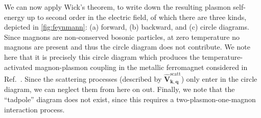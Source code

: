 \documentclass[aps,prb,reprint,twocolumns,superscriptaddress,nofootinbib]{revtex4-2}
\begin{document}
	We can now apply Wick's theorem, to write down the resulting plasmon self-energy \cite{stoofUltracoldQuantumFields2009} up to second order in the electric field, of which there are three kinds, depicted in \cref{fig:feynmann}: (a) forward, (b) backward, and (c) circle diagrams. Since magnons are non-conserved bosonic particles, at zero temperature no magnons are present and thus the circle diagram does not contribute. We note here that it is precisely this circle diagram which produces the temperature-activated magnon-plasmon coupling in the metallic ferromagnet considered in Ref.~\cite{ghoshPlasmonmagnonInteractionsTwodimensional2023}. Since the scattering processes (described by $\hat{\bm V}_{\bm k,\bm q}^{\mathrm{scatt}}$) only enter in the circle diagram, we can neglect them from here on out. Finally, we note that the ``tadpole'' diagram does not exist, since this requires a two-plasmon-one-magnon interaction process.
	
\end{document}
